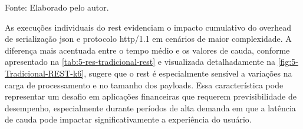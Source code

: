 \begin{table}[H]
\centering
\caption{\gls{rest} comparado com os demais protocolos — Cenário Tradicional ($\Delta$\% vs \gls{rest})}
\label{tab:5-res-tradicional-rest}
{\par \raggedright \footnotesize Fonte: Elaborado pelo autor.\par}
\end{table}

As execuções individuais do \gls{rest} evidenciam o impacto cumulativo do overhead de serialização \acrshort{json} e protocolo \acrshort{http}/1.1 em cenários de maior complexidade. A diferença mais acentuada entre o tempo médio e os valores de cauda, conforme apresentado na \autoref{tab:5-res-tradicional-rest} e visualizada detalhadamente na \autoref{fig:5-Tradicional-REST-k6}, sugere que o \gls{rest} é especialmente sensível a variações na carga de processamento e no tamanho dos payloads. Essa característica pode representar um desafio em aplicações financeiras que requerem previsibilidade de desempenho, especialmente durante períodos de alta demanda em que a latência de cauda pode impactar significativamente a experiência do usuário.

